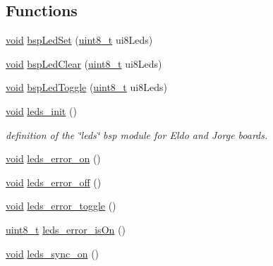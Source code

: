 \subsection*{Functions}
\begin{DoxyCompactItemize}
\item 
\hyperlink{usb__devapi_8h_afabf60e7f57651d6d595a02c75f07cd0}{void} \hyperlink{_open_mote-_c_c2538_2leds_8c_ab379bc6c2333ed2fc3b4809e664bde0b}{bsp\+Led\+Set} (\hyperlink{_p_e___types_8h_aba7bc1797add20fe3efdf37ced1182c5}{uint8\+\_\+t} ui8\+Leds)
\item 
\hyperlink{usb__devapi_8h_afabf60e7f57651d6d595a02c75f07cd0}{void} \hyperlink{_open_mote-_c_c2538_2leds_8c_a8b7c62e6e9f8fc03ef49609b7530c374}{bsp\+Led\+Clear} (\hyperlink{_p_e___types_8h_aba7bc1797add20fe3efdf37ced1182c5}{uint8\+\_\+t} ui8\+Leds)
\item 
\hyperlink{usb__devapi_8h_afabf60e7f57651d6d595a02c75f07cd0}{void} \hyperlink{_open_mote-_c_c2538_2leds_8c_ad92091a64bd0272c7aa9c9868eb06239}{bsp\+Led\+Toggle} (\hyperlink{_p_e___types_8h_aba7bc1797add20fe3efdf37ced1182c5}{uint8\+\_\+t} ui8\+Leds)
\item 
\hyperlink{usb__devapi_8h_afabf60e7f57651d6d595a02c75f07cd0}{void} \hyperlink{group__leds_ga67cfc3137a465e560792490e81365254}{leds\+\_\+init} ()
\begin{DoxyCompactList}\small\item\em definition of the \char`\"{}leds\char`\"{} bsp module for Eldo and Jorge boards. \end{DoxyCompactList}\item 
\hyperlink{usb__devapi_8h_afabf60e7f57651d6d595a02c75f07cd0}{void} \hyperlink{group__leds_ga248d93c2ed295c1c463984b881e1b9af}{leds\+\_\+error\+\_\+on} ()
\item 
\hyperlink{usb__devapi_8h_afabf60e7f57651d6d595a02c75f07cd0}{void} \hyperlink{group__leds_ga4639337fca09b91f2136c2843a19e1b3}{leds\+\_\+error\+\_\+off} ()
\item 
\hyperlink{usb__devapi_8h_afabf60e7f57651d6d595a02c75f07cd0}{void} \hyperlink{group__leds_gaa0f84f5b86315c3eed24fc48a826f991}{leds\+\_\+error\+\_\+toggle} ()
\item 
\hyperlink{_p_e___types_8h_aba7bc1797add20fe3efdf37ced1182c5}{uint8\+\_\+t} \hyperlink{group__leds_ga49f878b007c160726b61f01fa6afce85}{leds\+\_\+error\+\_\+is\+On} ()
\item 
\hyperlink{usb__devapi_8h_afabf60e7f57651d6d595a02c75f07cd0}{void} \hyperlink{group__leds_gaf1a59644fa7758343d6666e18a4c484c}{leds\+\_\+sync\+\_\+on} ()

\end{DoxyCompactItemize}
